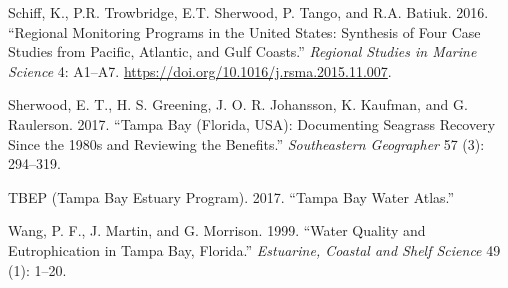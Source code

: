 \documentclass[]{article}
\begin{document}
\hypertarget{ref-Schiff16}{}
Schiff, K., P.R. Trowbridge, E.T. Sherwood, P. Tango, and R.A. Batiuk.
2016. ``Regional Monitoring Programs in the United States: Synthesis of
Four Case Studies from Pacific, Atlantic, and Gulf Coasts.''
\emph{Regional Studies in Marine Science} 4: A1--A7.
\url{https://doi.org/10.1016/j.rsma.2015.11.007}.

\hypertarget{ref-Sherwood17}{}
Sherwood, E. T., H. S. Greening, J. O. R. Johansson, K. Kaufman, and G.
Raulerson. 2017. ``Tampa Bay (Florida, USA): Documenting Seagrass
Recovery Since the 1980s and Reviewing the Benefits.''
\emph{Southeastern Geographer} 57 (3): 294--319.

\hypertarget{ref-TBEP17}{}
TBEP (Tampa Bay Estuary Program). 2017. ``Tampa Bay Water Atlas.''

\hypertarget{ref-Wang99}{}
Wang, P. F., J. Martin, and G. Morrison. 1999. ``Water Quality and
Eutrophication in Tampa Bay, Florida.'' \emph{Estuarine, Coastal and
Shelf Science} 49 (1): 1--20.
\end{document}
